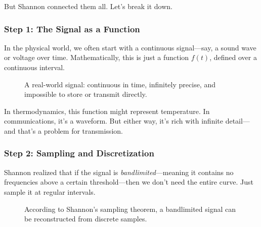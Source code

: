 But Shannon connected them all. Let’s break it down.

\subsubsection{Step 1: The Signal as a Function}
In the physical world, we often start with a continuous signal—say, a sound wave or voltage over time. Mathematically, this is just a function \( f(t) \), defined over a continuous interval.

\begin{figure}[H]
\centering
{}
\caption{A real-world signal: continuous in time, infinitely precise, and impossible to store or transmit directly.}
\end{figure}

In thermodynamics, this function might represent temperature. In communications, it’s a waveform. But either way, it’s rich with infinite detail—and that’s a problem for transmission.

\subsubsection{Step 2: Sampling and Discretization}
Shannon realized that if the signal is \emph{bandlimited}—meaning it contains no frequencies above a certain threshold—then we don’t need the entire curve. Just sample it at regular intervals.

\begin{figure}[H]
\centering
{}
\caption{According to Shannon’s sampling theorem, a bandlimited signal can be reconstructed from discrete samples.}
\end{figure}

